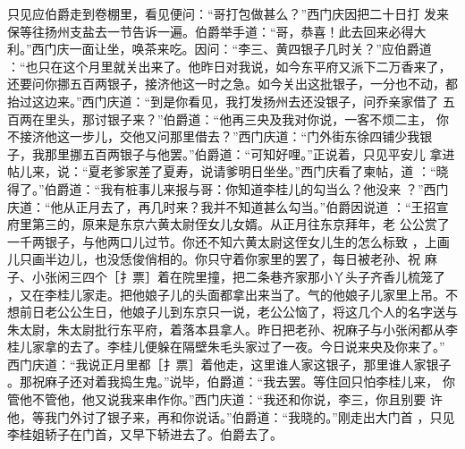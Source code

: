 只见应伯爵走到卷棚里，看见便问：“哥打包做甚么？”西门庆因把二十日打
发来保等往扬州支盐去一节告诉一遍。伯爵举手道：“哥，恭喜！此去回来必得大
利。”西门庆一面让坐，唤茶来吃。因问：“李三、黄四银子几时关？”应伯爵道
：“也只在这个月里就关出来了。他昨日对我说，如今东平府又派下二万香来了，
还要问你挪五百两银子，接济他这一时之急。如今关出这批银子，一分也不动，都
抬过这边来。”西门庆道：“到是你看见，我打发扬州去还没银子，问乔亲家借了
五百两在里头，那讨银子来？”伯爵道：“他再三央及我对你说，一客不烦二主，
你不接济他这一步儿，交他又问那里借去？”西门庆道：“门外街东徐四铺少我银
子，我那里挪五百两银子与他罢。”伯爵道：“可知好哩。”正说着，只见平安儿
拿进帖儿来，说：“夏老爹家差了夏寿，说请爹明日坐坐。”西门庆看了柬帖，道
：“晓得了。”伯爵道：“我有桩事儿来报与哥：你知道李桂儿的勾当么？他没来
？”西门庆道：“他从正月去了，再几时来？我并不知道甚么勾当。”伯爵因说道
：“王招宣府里第三的，原来是东京六黄太尉侄女儿女婿。从正月往东京拜年，老
公公赏了一千两银子，与他两口儿过节。你还不知六黄太尉这侄女儿生的怎么标致
，上画儿只画半边儿，也没恁俊俏相的。你只守着你家里的罢了，每日被老孙、祝
麻子、小张闲三四个［扌票］着在院里撞，把二条巷齐家那小丫头子齐香儿梳笼了
，又在李桂儿家走。把他娘子儿的头面都拿出来当了。气的他娘子儿家里上吊。不
想前日老公公生日，他娘子儿到东京只一说，老公公恼了，将这几个人的名字送与
朱太尉，朱太尉批行东平府，着落本县拿人。昨日把老孙、祝麻子与小张闲都从李
桂儿家拿的去了。李桂儿便躲在隔壁朱毛头家过了一夜。今日说来央及你来了。”
西门庆道：“我说正月里都［扌票］着他走，这里谁人家这银子，那里谁人家银子
。那祝麻子还对着我捣生鬼。”说毕，伯爵道：“我去罢。等住回只怕李桂儿来，
你管他不管他，他又说我来串作你。”西门庆道：“我还和你说，李三，你且别要
许他，等我门外讨了银子来，再和你说话。”伯爵道：“我晓的。”刚走出大门首
，只见李桂姐轿子在门首，又早下轿进去了。伯爵去了。

